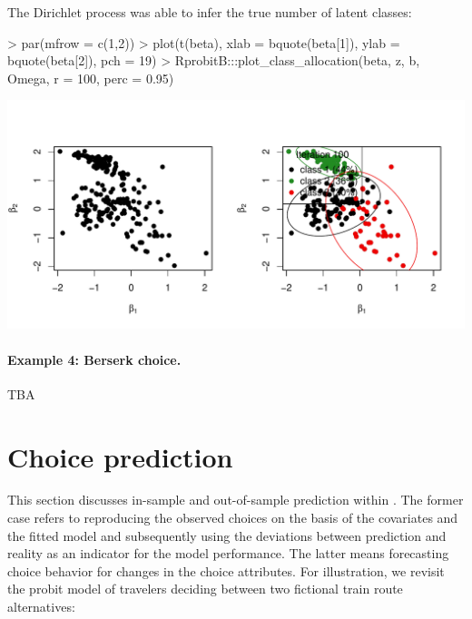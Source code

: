 \documentclass[article]{jss}
\begin{document}
\begin{Schunk}
\end{Schunk}

The Dirichlet process was able to infer the true number  of latent classes:

\begin{Schunk}
\begin{Sinput}
> par(mfrow = c(1,2))
> plot(t(beta), xlab = bquote(beta[1]), ylab = bquote(beta[2]), pch = 19)
> RprobitB:::plot_class_allocation(beta, z, b, Omega, r = 100, perc = 0.95)
\end{Sinput}
\end{Schunk}
\includegraphics{rprobitb_oelschlaeger_bauer-dp-example}

\paragraph{Example 4: Berserk choice.}

TBA

\section{Choice prediction} \label{sec:choice_prediction}

This section discusses in-sample and out-of-sample prediction within . The former case refers to reproducing the observed choices on the basis of the covariates and the fitted model and subsequently using the deviations between prediction and reality as an indicator for the model performance. The latter means forecasting choice behavior for changes in the choice attributes. For illustration, we revisit the probit model of travelers deciding between two fictional train route alternatives:
\end{document}

